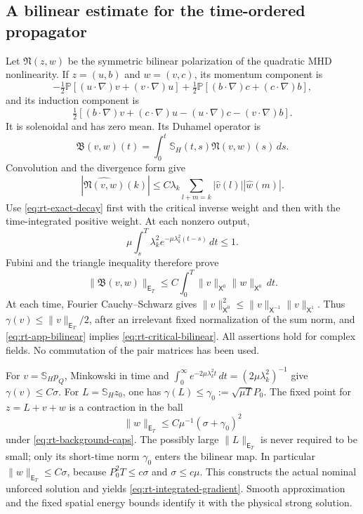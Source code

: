 \documentclass[11pt,a4paper]{amsart}
\theoremstyle{definition}
\theoremstyle{remark}
\numberwithin{equation}{section}
\newcommand{\PP}{\mathbb P}
\newcommand{\norm}[1]{\lVert #1\rVert}
\begin{document}
\subsection{A bilinear estimate for the time-ordered propagator}
Let $\mathfrak N(z,w)$ be the symmetric bilinear polarization of the
quadratic MHD nonlinearity.  If $z=(u,b)$ and $w=(v,c)$, its momentum
component is
\[
 -\tfrac12\PP[(u\cdot\nabla)v+(v\cdot\nabla)u]
 +\tfrac12\PP[(b\cdot\nabla)c+(c\cdot\nabla)b],
\]
and its induction component is
\[
 \tfrac12[(b\cdot\nabla)v+(c\cdot\nabla)u
                 -(u\cdot\nabla)c-(v\cdot\nabla)b].
\]
It is solenoidal and has zero mean.  Its Duhamel operator is
\[
 \mathfrak B(v,w)(t)=\int_0^t\mathbb S_H(t,s)
                         \mathfrak N(v,w)(s)\,ds.
\]
Convolution and the divergence form give
\[
 |\widehat{\mathfrak N(v,w)}(k)|
 \le C\lambda_k\sum_{l+m=k}|\widehat v(l)||\widehat w(m)|.
\]
Use \eqref{eq:rt-exact-decay} first with the critical inverse weight and
then with the time-integrated positive weight.  At each nonzero output,
\[
 \mu\int_s^T\lambda_k^2e^{-\mu\lambda_k^2(t-s)}\,dt\le1.
\]
Fubini and the triangle inequality therefore prove
\begin{equation}\label{eq:rt-app-bilinear}
 \norm{\mathfrak B(v,w)}_{\mathsf E_T}
 \le C\int_0^T\norm v_{\mathsf X^0}\norm w_{\mathsf X^0}\,dt.
\end{equation}
At each time, Fourier Cauchy--Schwarz gives
$\norm v_{\mathsf X^0}^2\le
\norm v_{\mathsf X^{-1}}\norm v_{\mathsf X^1}$.
Thus $\gamma(v)\le\norm v_{\mathsf E_T}/2$, after an irrelevant fixed
normalization of the sum norm, and \eqref{eq:rt-app-bilinear} implies
\eqref{eq:rt-critical-bilinear}.  All assertions hold for complex fields.
No commutation of the pair matrices has been used.

For $v=\mathbb S_Hp_Q$, Minkowski in time and
$\int_0^\infty e^{-2\mu\lambda_k^2t}\,dt
=(2\mu\lambda_k^2)^{-1}$ give $\gamma(v)\le C\sigma$.
For $L=\mathbb S_Hz_0$, one has
$\gamma(L)\le\gamma_0:=\sqrt{\mu T}P_0$.
The fixed point for $z=L+v+w$ is a contraction in the ball
\begin{equation}\label{eq:rt-app-ball}
 \norm w_{\mathsf E_T}\le C\mu^{-1}(\sigma+\gamma_0)^2
\end{equation}
under \eqref{eq:rt-background-caps}.  The possibly large
$\norm L_{\mathsf E_T}$ is never required to be small; only its
short-time norm $\gamma_0$ enters the bilinear map.  In particular
$\norm w_{\mathsf E_T}\le C\sigma$, because
$P_0^2T\le c\sigma$ and $\sigma\le c\mu$.
This constructs the actual nominal unforced solution and yields
\eqref{eq:rt-integrated-gradient}.  Smooth approximation and the fixed
spatial energy bounds identify it with the physical strong solution.
\end{document}
